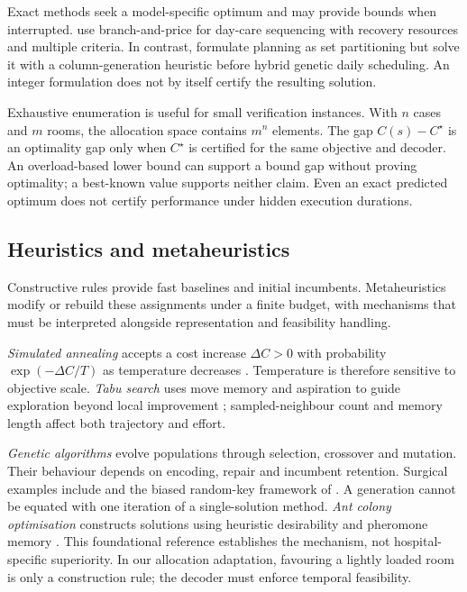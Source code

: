Exact methods seek a model-specific optimum and may provide bounds when
interrupted. \citet{cardoen2009} use branch-and-price for day-care sequencing
with recovery resources and multiple criteria. In contrast, \citet{fei2010}
formulate planning as set partitioning but solve it with a column-generation
heuristic before hybrid genetic daily scheduling. An integer formulation
does not by itself certify the resulting solution.

Exhaustive enumeration is useful for small verification instances. With $n$
cases and $m$ rooms, the allocation space contains $m^n$ elements. The gap
$C(s)-C^\star$ is an optimality gap only when $C^\star$ is certified for the
same objective and decoder. An overload-based lower bound can support a bound
gap without proving optimality; a best-known value supports neither claim.
Even an exact predicted optimum does not certify performance under hidden
execution durations.

\subsection{Heuristics and metaheuristics}

Constructive rules provide fast baselines and initial incumbents.
Metaheuristics modify or rebuild these assignments under a finite budget,
with mechanisms that must be interpreted alongside representation and
feasibility handling.

\emph{Simulated annealing} accepts a cost increase $\Delta C>0$ with
probability $\exp(-\Delta C/T)$ as temperature decreases
\citep{kirkpatrick1983}. Temperature is therefore sensitive to objective
scale. \emph{Tabu search} uses move memory and aspiration to guide exploration
beyond local improvement \citep{glover1989}; sampled-neighbour count and
memory length affect both trajectory and effort.

\emph{Genetic algorithms} evolve populations through selection, crossover
and mutation. Their behaviour depends on encoding, repair and incumbent
retention. Surgical examples include \citet{fei2010} and the biased random-key
framework of \citet{vieira2025}. A generation cannot be equated with one
iteration of a single-solution method. \emph{Ant colony optimisation}
constructs solutions using heuristic desirability and pheromone memory
\citep{dorigo1996}. This foundational reference establishes the mechanism,
not hospital-specific superiority. In our allocation adaptation, favouring
a lightly loaded room is only a construction rule; the decoder must enforce
temporal feasibility.

